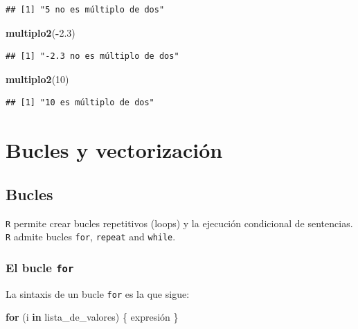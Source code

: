 \documentclass[]{book}
\newenvironment{Shaded}{\begin{snugshade}}{\end{snugshade}}
\newcommand{\ControlFlowTok}[1]{\textcolor[rgb]{0.13,0.29,0.53}{\textbf{#1}}}
\newcommand{\DecValTok}[1]{\textcolor[rgb]{0.00,0.00,0.81}{#1}}
\newcommand{\FloatTok}[1]{\textcolor[rgb]{0.00,0.00,0.81}{#1}}
\newcommand{\KeywordTok}[1]{\textcolor[rgb]{0.13,0.29,0.53}{\textbf{#1}}}
\newcommand{\NormalTok}[1]{#1}
\newcommand{\OperatorTok}[1]{\textcolor[rgb]{0.81,0.36,0.00}{\textbf{#1}}}
\begin{document}
\begin{verbatim}
## [1] "5 no es múltiplo de dos"
\end{verbatim}

\begin{Shaded}
\begin{Highlighting}[]
\KeywordTok{multiplo2}\NormalTok{(}\OperatorTok{-}\FloatTok{2.3}\NormalTok{)}
\end{Highlighting}
\end{Shaded}

\begin{verbatim}
## [1] "-2.3 no es múltiplo de dos"
\end{verbatim}

\begin{Shaded}
\begin{Highlighting}[]
\KeywordTok{multiplo2}\NormalTok{(}\DecValTok{10}\NormalTok{)}
\end{Highlighting}
\end{Shaded}

\begin{verbatim}
## [1] "10 es múltiplo de dos"
\end{verbatim}

\hypertarget{bucles-y-vectorizacion}{%
\section{Bucles y vectorización}\label{bucles-y-vectorizacion}}

\hypertarget{bucles}{%
\subsection{Bucles}\label{bucles}}

\texttt{R} permite crear bucles repetitivos
(loops) y la ejecución condicional de sentencias. \texttt{R} admite bucles
\texttt{for}, \texttt{repeat} and \texttt{while}.

\hypertarget{el-bucle-for}{%
\subsubsection{\texorpdfstring{El bucle \texttt{for}}{El bucle for}}\label{el-bucle-for}}

La sintaxis de un bucle \texttt{for} es la que sigue:

\begin{Shaded}
\begin{Highlighting}[]
\ControlFlowTok{for}\NormalTok{ (i }\ControlFlowTok{in}\NormalTok{ lista_de_valores)  \{ expresión \}}
\end{Highlighting}
\end{Shaded}
\end{document}
